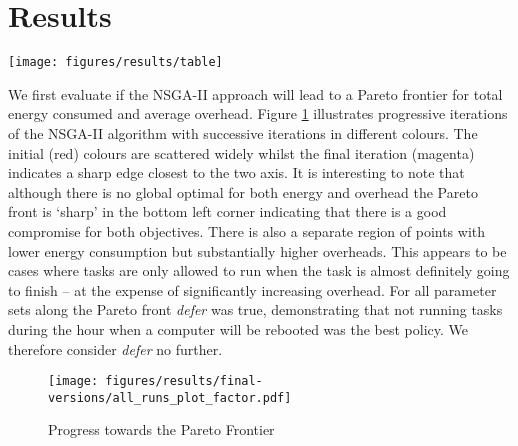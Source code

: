 \documentclass[10pt, conference, compsocconf]{IEEEtran}
\begin{document}
\section{Results}%
\label{results}
\begin{table*}[tb]
\caption{Parameters for optimal objectives}
\label{tab:optimal}
\vskip -8pt
\centering
\texttt{[image: figures/results/table]}
\vskip -12pt
\end{table*}
We first evaluate if the NSGA-II approach will lead to a Pareto frontier for total energy consumed and average overhead. Figure \ref{fig:pareto} illustrates progressive iterations of the NSGA-II algorithm with successive iterations in different colours. The initial (red) colours are scattered widely whilst the final iteration (magenta) indicates a sharp edge closest to the two axis. It is interesting to note that although there is no global optimal for both energy and overhead the Pareto front is `sharp' in the bottom left corner indicating that there is a good compromise for both objectives. There is also a separate region of points with lower energy consumption but substantially higher overheads. This appears to be cases where tasks are only allowed to run when the task is almost definitely going to finish -- at the expense of significantly increasing overhead. For all parameter sets along the Pareto front {\em defer} was true, demonstrating that not running tasks during the hour when a computer will be rebooted was the best policy. We therefore consider {\em defer} no further.
\begin{figure}[t]
\centering
  \texttt{[image: figures/results/final-versions/all\_runs\_plot\_factor.pdf]}
  \vskip -12pt
  \caption{Progress towards the Pareto Frontier}
  \label{fig:pareto}
\vskip -9pt
\end{figure}
\end{document}
